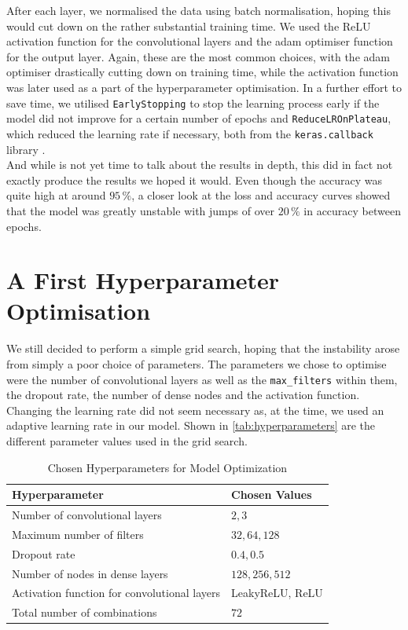 After each layer, we normalised the data using batch normalisation, hoping this would cut down on the rather substantial training time.
We used the ReLU activation function for the convolutional layers and the adam optimiser function for the output layer.
Again, these are the most common choices, with the adam optimiser drastically cutting down on training time, 
while the activation function was later used as a part of the hyperparameter optimisation.
In a further effort to save time, we utilised \texttt{EarlyStopping} to stop the learning process early if the model did not improve for a certain number of epochs
and \texttt{ReduceLROnPlateau}, which reduced the learning rate if necessary, both from the \texttt{keras.callback} library \cite{keras}.  \\

And while is not yet time to talk about the results in depth, this did in fact not exactly produce the results we hoped it would.
Even though the accuracy was quite high at around $95 \,\%$, a closer look at the loss and accuracy curves showed that the model was greatly unstable
with jumps of over $20 \,\%$ in accuracy between epochs.


\section{A First Hyperparameter Optimisation}
\label{sec:results}

We still decided to perform a simple grid search, hoping that the instability arose from simply a poor choice of parameters.
The parameters we chose to optimise were the number of convolutional layers as well as the \texttt{max\_filters} within them, the dropout rate, the number of dense nodes
and the activation function.
Changing the learning rate did not seem necessary as, at the time, we used an adaptive learning rate in our model. 
Shown in \autoref{tab:hyperparameters} are the different parameter values used in the grid search. \\

\begin{table}[H]
    \centering
    \begin{tabular}{ll}
        \toprule
        \textbf{Hyperparameter} & \textbf{Chosen Values} \\
        \midrule
        Number of convolutional layers               & {$2, 3$}\\
        Maximum number of filters                    & {$32, 64, 128$}\\
        Dropout rate                                 & {$0.4, 0.5$}\\
        Number of nodes in dense layers              & {$128, 256, 512$}\\
        Activation function for convolutional layers & {LeakyReLU, ReLU}\\
        Total number of combinations                 & $72$\\
        \bottomrule
    \end{tabular}
    \caption{Chosen Hyperparameters for Model Optimization}
    \label{tab:hyperparameters}
\end{table}

